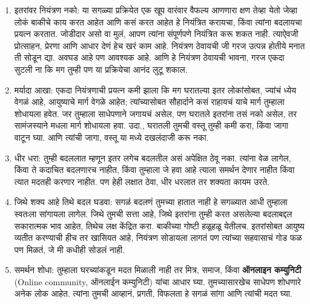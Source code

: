\begin{enumerate}
 \item  इतरांवर नियंत्रण नको: या सगळ्या प्रक्रियेत एक खूप वारंवार वैफल्य आणणारा क्षण तेव्हा येतो जेव्हा लोकं बाकीचे काय करत आहेत आणि कसं करत आहेत हे नियंत्रित करायचा, किंवा त्यांना बदलायचा प्रयत्न करतात. जोडीदार असो वा मुलं, आपण त्यांना संपूर्णपणे नियंत्रित करू शकत नाही. त्याऐवजी प्रोत्साहन, प्रेरणा आणि आधार देणं हेच खरं काम आहे. नियंत्रण ठेवायची जी गरज उत्पन्न होतीये मनात ती सोडून द्या. अवघड आहे पण आवश्यक आहे. आणि हे नियंत्रण ठेवायची भावना, गरज एकदा सुटली ना कि मग तुम्ही पण या प्रक्रियेचा आनंद लुटू शकाल. 
 \item  मर्यादा आखा: एकदा नियंत्रणाची प्रयत्न कमी झाला कि मग घरातल्या इतर लोकांसोबत, ज्यांचं ध्येय वेगळं आहे, आयुष्याचे मार्ग वेगळे आहेत; त्यांच्यासोबत सौहार्दाने कसं राहायचं याचे मार्ग तुम्हाला शोधायला हवेत. जर तुम्हाला साधेपणाने जगायचं असेल, पण घरातले इतरांना तसं नको असेल, तर सामंजस्याने मधला मार्ग शोधायला हवा. उदा., घरातली तुमची वस्तू तुम्ही कमी करा, किंवा जागा वाटून घ्या. आणि त्यांची जागा, वस्तू या मध्ये दखलंदाजी करू नका.
 \item   धीर धरा: तुम्ही बदललात म्हणून इतर लगेच बदलतील असं अपेक्षित ठेवू नका. त्यांना वेळ लागेल, किंवा ते कदाचित बदलणारच नाहीत, किंवा तुम्हाला जे हवा आहे त्याला समर्थन देणार नाहीत किंवा त्यात मदतही करणार नाहीत. पण हेही लक्षात ठेवा,  धीर धरलात तर शक्यता कायम उरते.
 \item जिथे शक्य आहे तिथे बदल घडवा: सगळं बदलणं तुमच्या हातात नाही हे सगळ्यात आधी तुम्हाला स्वतःला सांगायला लागेल. जिथे तुमची सत्ता आहे, जिथे इतरांना तुम्ही करत असलेल्या बदलाबद्दल सकारात्मक भाव आहेत, तिथेच लक्ष केंद्रित करा. बाकीच्या गोष्टी हळूहळू येतीलच. इतरांसोबत आयुष्य व्यतीत करण्याची हीच तर खासियत आहे, नियंत्रण सोडायला लागतं पण त्यांच्या सहवासाचं गोड फळ पण मिळतं, जे मी कधीही सोडलं नाही. 
 \item समर्थन शोधा: तुम्हाला घरच्यांकडून मदत मिळाली नाही तर मित्र, समाज, किंवा \textbf{ऑनलाइन कम्युनिटी} (Online community,  ऑनलाईन कम्युनिटी) यांचा आधार घ्या. तुमच्यासारखेच साधेपण शोधणारे अनेक लोक आहेत. त्यांना तुमची आव्हानं, प्रगती, विफलता हे सगळं सांगा आणि त्यांची मदत घ्या.
\end{enumerate}
